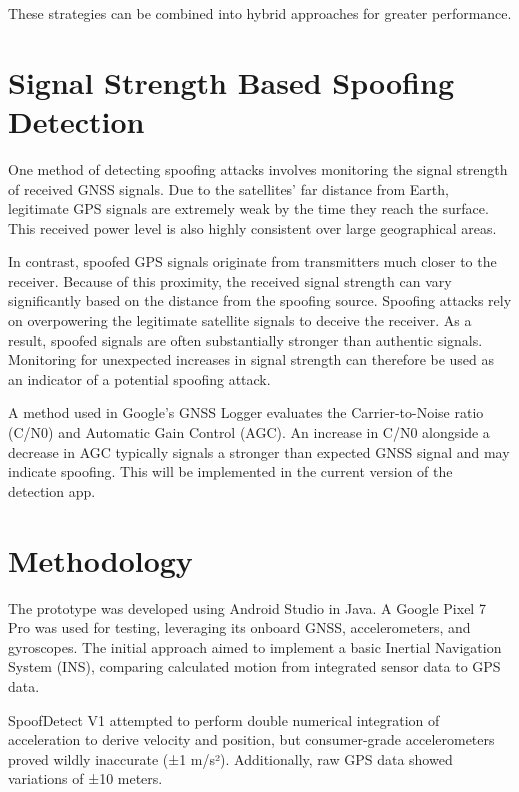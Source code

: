 \documentclass[conference]{IEEEtran}
\begin{document}
These strategies can be combined into hybrid approaches for greater performance.

\section{Signal Strength Based Spoofing Detection}
One method of detecting spoofing attacks involves monitoring the signal strength of received GNSS signals. Due to the satellites’ far distance from Earth, legitimate GPS signals are extremely weak by the time they reach the surface. This received power level is also highly consistent over large geographical areas\cite{lo2021}.

In contrast, spoofed GPS signals originate from transmitters much closer to the receiver. Because of this proximity, the received signal strength can vary significantly based on the distance from the spoofing source. Spoofing attacks rely on overpowering the legitimate satellite signals to deceive the receiver. As a result, spoofed signals are often substantially stronger than authentic signals. Monitoring for unexpected increases in signal strength can therefore be used as an indicator of a potential spoofing attack\cite{lo2021}.

A method used in Google's GNSS Logger evaluates the Carrier-to-Noise ratio (C/N0) and Automatic Gain Control (AGC). An increase in C/N0 alongside a decrease in AGC typically signals a stronger than expected GNSS signal and may indicate spoofing\cite{spens2022}. This will be implemented in the current version of the detection app.

\section{Methodology}
The prototype was developed using Android Studio in Java. A Google Pixel 7 Pro was used for testing, leveraging its onboard GNSS, accelerometers, and gyroscopes. The initial approach aimed to implement a basic Inertial Navigation System (INS), comparing calculated motion from integrated sensor data to GPS data.

SpoofDetect V1 attempted to perform double numerical integration of acceleration to derive velocity and position, but consumer-grade accelerometers proved wildly inaccurate (±1 m/s²). Additionally, raw GPS data showed variations of ±10 meters.
\end{document}
